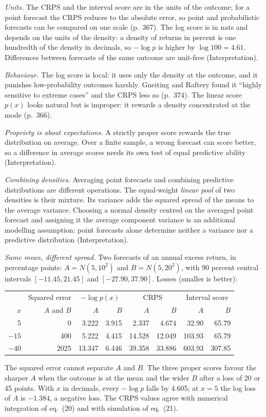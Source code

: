 \begin{qfmethod}
 \emph{Units.} The CRPS and the interval score are in the units of the outcome; for a point forecast the CRPS reduces to the absolute error, so point and probabilistic forecasts can be compared on one scale (p.~367). The log score is in nats and depends on the units of the density: a density of returns in percent is one hundredth of the density in decimals, so $-\log p$ is higher by $\log100=4.61$. Differences between forecasts of the same outcome are unit-free (Interpretation).

\emph{Behaviour.} The log score is local: it uses only the density at the outcome, and it punishes low-probability outcomes harshly. Gneiting and Raftery found it ``highly sensitive to extreme cases'' and the CRPS less so (p.~374). The linear score $p(x)$ looks natural but is improper: it rewards a density concentrated at the mode (p.~366).

\emph{Propriety is about expectations.} A strictly proper score rewards the true distribution on average. Over a finite sample, a wrong forecast can score better, so a difference in average scores needs its own test of equal predictive ability (Interpretation).

\emph{Combining densities.} Averaging point forecasts and combining predictive distributions are different operations. The equal-weight \emph{linear pool} of two densities is their mixture. Its variance adds the squared spread of the means to the average variance. Choosing a normal density centred on the averaged point forecast and assigning it the average component variance is an additional modelling assumption: point forecasts alone determine neither a variance nor a predictive distribution (Interpretation).

 \emph{Same mean, different spread.} Two forecasts of an annual excess return, in percentage points: $A=N(5,10^2)$ and $B=N(5,20^2)$, with 90 percent central intervals $[-11.45,21.45]$ and $[-27.90,37.90]$. Losses (smaller is better):
\begin{center}\small
\begin{tabular}{@{}rrrrrrrr@{}}
\toprule
& Squared error & \multicolumn{2}{c}{$-\log p(x)$} & \multicolumn{2}{c}{CRPS} & \multicolumn{2}{c}{Interval score} \\
$x$ & $A$ and $B$ & $A$ & $B$ & $A$ & $B$ & $A$ & $B$ \\
\midrule
5 & 0 & 3.222 & 3.915 & 2.337 & 4.674 & 32.90 & 65.79 \\
$-15$ & 400 & 5.222 & 4.415 & 14.528 & 12.049 & 103.93 & 65.79 \\
$-40$ & 2025 & 13.347 & 6.446 & 39.358 & 33.886 & 603.93 & 307.85 \\
\bottomrule
\end{tabular}
\end{center}
The squared error cannot separate $A$ and $B$. The three proper scores favour the sharper $A$ when the outcome is at the mean and the wider $B$ after a loss of 20 or 45 points. With $x$ in decimals, every $-\log p$ falls by 4.605; at $x=5$ the log loss of $A$ is $-1.384$, a negative loss. The CRPS values agree with numerical integration of eq.~(20) and with simulation of eq.~(21).


\end{qfmethod}
